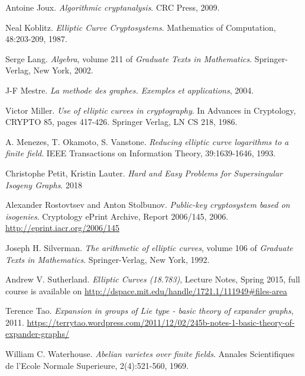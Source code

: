 \documentclass{article}
\theoremstyle{theorem}
\theoremstyle{definition}
\begin{document}
\begin{thebibliography}{}
	 Antoine Joux. \textit{Algorithmic cryptanalysis}. CRC Press, 2009.
	
	 Neal Koblitz. \textit{Elliptic Curve Cryptosystems}. Mathematics of Computation, 48:203-209, 1987.
	
	 Serge Lang. \textit{Algebra}, volume 211 of \textit{Graduate Texts in Mathematics}. Springer-Verlag, New York, 2002.

	 J-F Mestre. \textit{La methode des graphes. Exemples et applications}, 2004.
	
	 Victor Miller. \textit{Use of elliptic curves in cryptography}. In Advances in Cryptology, CRYPTO 85, pages 417-426. Springer Verlag, LN CS 218, 1986.
	
	 A. Menezes, T. Okamoto, S. Vanstone. \textit{Reducing elliptic curve logarithms to a finite field}. IEEE Transactions on Information Theory, 39:1639-1646, 1993.
	
	 Christophe Petit, Kristin Lauter. \textit{Hard and Easy Problems for Supersingular Isogeny Graphs}. 2018
	
	 Alexander Rostovtsev and Anton Stolbunov. \textit{Public-key cryptosystem based on isogenies}. Cryptology ePrint Archive, Report 2006/145, 2006. \url{http://eprint.iacr.org/2006/145}
	
	 Joseph H. Silverman. \textit{The arithmetic of elliptic curves}, volume 106 of \textit{Graduate Texts in Mathematics}. Springer-Verlag, New York, 1992.

	 Andrew V. Sutherland. \textit{  Elliptic Curves (18.783)}, Lecture Notes, Spring 2015, full course is available on \url{http://dspace.mit.edu/handle/1721.1/111949#files-area}
	
	 Terence Tao. \textit{Expansion in groups of Lie type  - basic theory of expander graphs}, 2011. \url{https://terrytao.wordpress.com/2011/12/02/245b-notes-1-basic-theory-of-expander-graphs/}
	
	 William C. Waterhouse. \textit{Abelian varietes over finite fields}. Annales Scientifiques de l'Ecole Normale Superieure, 2(4):521-560, 1969.
	
	
\end{thebibliography}
\end{document}
